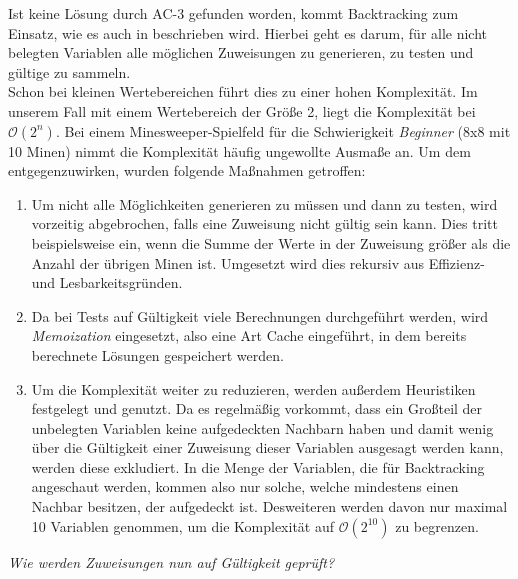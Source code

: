 Ist keine Lösung durch AC-3 gefunden worden, kommt Backtracking zum Einsatz, wie es auch in \cite{Alan} beschrieben wird. Hierbei geht es darum,
für alle nicht belegten Variablen alle möglichen Zuweisungen zu generieren, zu testen und gültige zu sammeln.\\ Schon bei kleinen Wertebereichen
führt dies zu einer hohen Komplexität. Im unserem Fall mit einem Wertebereich der Größe 2, liegt die Komplexität bei $\mathcal{O}(2^n)$.
Bei einem Minesweeper-Spielfeld für die Schwierigkeit \textit{Beginner} (8x8 mit 10 Minen) nimmt die Komplexität häufig ungewollte Ausmaße an.
Um dem entgegenzuwirken, wurden folgende Maßnahmen getroffen:\clearpage
\begin{enumerate}
    \item Um nicht alle Möglichkeiten generieren zu müssen und dann zu testen, wird vorzeitig abgebrochen, falls eine Zuweisung nicht gültig sein
    kann. Dies tritt beispielsweise ein, wenn die Summe der Werte in der Zuweisung größer als die Anzahl der übrigen Minen ist. Umgesetzt wird
    dies rekursiv aus Effizienz- und Lesbarkeitsgründen.
    \item Da bei Tests auf Gültigkeit viele Berechnungen durchgeführt werden, wird \textit{Memoization} eingesetzt, also eine Art Cache eingeführt,
    in dem bereits berechnete Lösungen gespeichert werden. 
    \item Um die Komplexität weiter zu reduzieren, werden außerdem Heuristiken festgelegt und genutzt. Da es regelmäßig vorkommt, dass ein
    Großteil der unbelegten Variablen keine aufgedeckten Nachbarn haben und damit wenig über die Gültigkeit einer Zuweisung dieser Variablen
    ausgesagt werden kann, werden diese exkludiert. In die Menge der Variablen, die für Backtracking angeschaut werden, kommen also nur solche,
    welche mindestens einen Nachbar besitzen, der aufgedeckt ist. Desweiteren werden davon nur maximal 10 Variablen genommen, um die Komplexität
    auf $\mathcal{O}(2^{10})$ zu begrenzen.
\end{enumerate}

\textit{Wie werden Zuweisungen nun auf Gültigkeit geprüft?}


